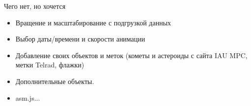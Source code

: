 \begin{frame}{Чего нет, но хочется}
  \begin{itemize}
  \item Вращение и масштабирование с подгрузкой данных
  \item Выбор даты/времени и скорости анимации
  \item Добавление своих объектов и меток (кометы и астероиды с сайта
    IAU MPC, метки Telrad, флажки)
  \item Дополнительные объекты.
  \item asm.js...
  \end{itemize}
\end{frame}
